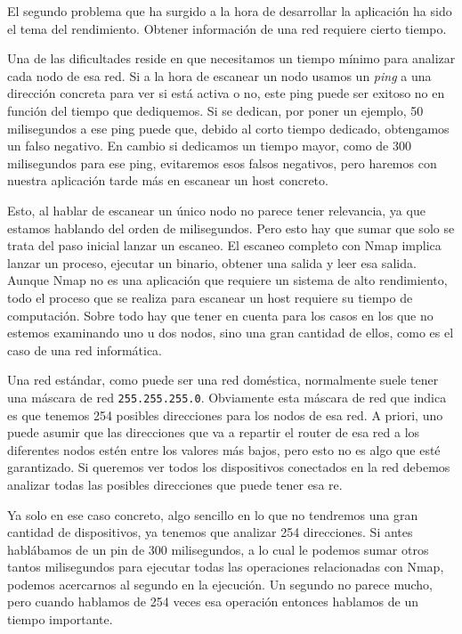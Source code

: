 El segundo problema que ha surgido a la hora de desarrollar la aplicación ha sido el tema del rendimiento. Obtener información de una red requiere cierto tiempo. 

Una de las dificultades reside en que necesitamos un tiempo mínimo para analizar cada nodo de esa red. Si a la hora de escanear un nodo usamos un \textit{ping} a una dirección concreta para ver si está activa o no, este ping puede ser exitoso no en función del tiempo que dediquemos. Si se dedican, por poner un ejemplo, 50 milisegundos a ese ping puede que, debido al corto tiempo dedicado, obtengamos un falso negativo. En cambio si dedicamos un tiempo mayor, como de 300 milisegundos para ese ping, evitaremos esos falsos negativos, pero haremos con nuestra aplicación tarde más en escanear un host concreto.

Esto, al hablar de escanear un único nodo no parece tener relevancia, ya que estamos hablando del orden de milisegundos. Pero esto hay que sumar que solo se trata del paso inicial lanzar un escaneo. El escaneo completo con Nmap implica lanzar un proceso, ejecutar un binario, obtener una salida y leer esa salida. Aunque Nmap no es una aplicación que requiere un sistema de alto rendimiento, todo el proceso que se realiza para escanear un host requiere su tiempo de computación. Sobre todo hay que tener en cuenta para los casos en los que no estemos examinando uno u dos nodos, sino una gran cantidad de ellos, como es el caso de una red informática.

Una red estándar, como puede ser una red doméstica, normalmente suele tener una máscara de red \texttt{255.255.255.0}. Obviamente esta máscara de red que indica es que tenemos 254 posibles direcciones para los nodos de esa red. A priori, uno puede asumir que las direcciones que va a repartir el router de esa red a los diferentes nodos estén entre los valores más bajos, pero esto no es algo que esté garantizado. Si queremos ver todos los dispositivos conectados en la red debemos analizar todas las posibles direcciones que puede tener esa re. 

Ya solo en ese caso concreto, algo sencillo en lo que no tendremos una gran cantidad de dispositivos, ya tenemos que analizar 254 direcciones. Si antes hablábamos de un pin de 300 milisegundos, a lo cual le podemos sumar otros tantos milisegundos para ejecutar todas las operaciones relacionadas con Nmap, podemos acercarnos al segundo en la ejecución. Un segundo no parece mucho, pero cuando hablamos de 254 veces esa operación entonces hablamos de un tiempo importante. 

